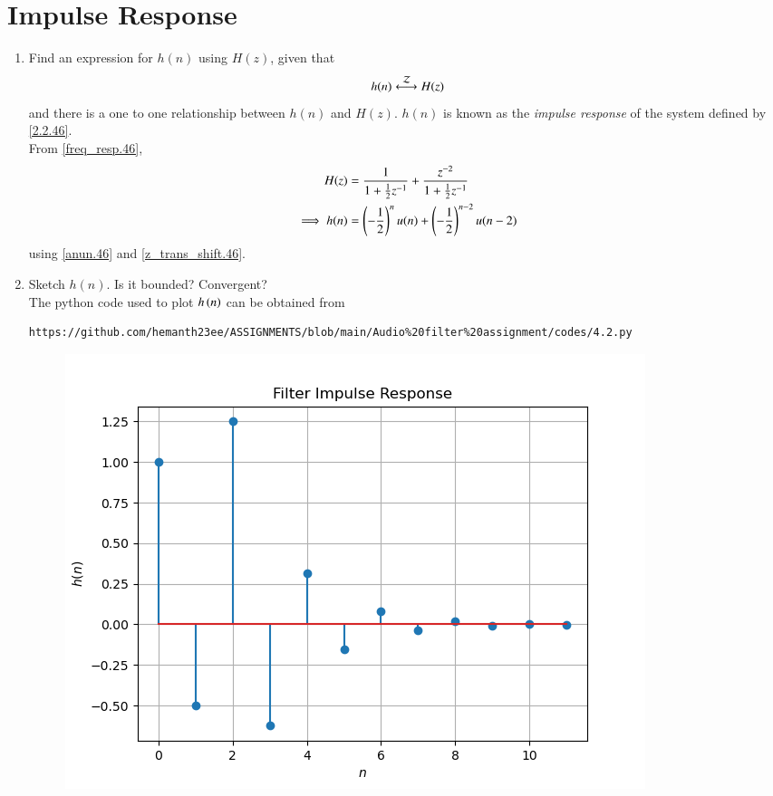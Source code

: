 \documentclass[journal,12pt,twocolumn]{IEEEtran}
\theoremstyle{remark}
\begin{document}
\section{Impulse Response}
\begin{enumerate}
\item \label{impulse_resp.46}
Find an expression for $h(n)$ using $H(z)$, given that 
\begin{equation}
\label{impulse_resp.46}
h(n) \system{Z} H(z)
\end{equation}
and there is a one to one relationship between $h(n)$ and $H(z)$. $h(n)$ is known as the {\em impulse response} of the
system defined by \eqref{2.2.46}.
\\
\solution From \eqref{freq_resp.46},
\begin{align}
H(z) &= \frac{1}{1 + \frac{1}{2}z^{-1}} + \frac{ z^{-2}}{1 + \frac{1}{2}z^{-1}}
\\
\implies h(n) &= \left(-\frac{1}{2}\right)^{n}u(n) + \left(-\frac{1}{2}\right)^{n-2}u(n-2)
\end{align}
using \eqref{anun.46} and \eqref{z_trans_shift.46}.
\item Sketch $h(n)$. Is it bounded? Convergent? 
\\
\solution The python code used to plot $h\left(n\right)$ can be obtained from 
\begin{lstlisting}
https://github.com/hemanth23ee/ASSIGNMENTS/blob/main/Audio%20filter%20assignment/codes/4.2.py
\end{lstlisting}
\begin{figure}[H]
\centering
\includegraphics[width=\columnwidth]{figs/hn}

\end{figure}
\end{enumerate}
\end{document}
